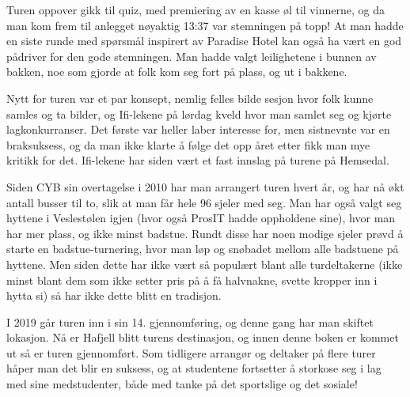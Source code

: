 Turen oppover gikk til quiz, med premiering av en kasse øl til vinnerne, og da man kom frem til anlegget nøyaktig 13:37 var stemningen på topp! At man hadde en siste runde med spørsmål inspirert av Paradise Hotel kan også ha vært en god pådriver for den gode stemningen. Man hadde valgt leilighetene i bunnen av bakken, noe som gjorde at folk kom seg fort på plass, og ut i bakkene.

Nytt for turen var et par konsept, nemlig felles bilde sesjon hvor folk kunne samles og ta bilder, og Ifi-lekene på lørdag kveld hvor man samlet seg og kjørte lagkonkurranser. Det første var heller laber interesse for, men sistnevnte var en braksuksess, og da man ikke klarte å følge det opp året etter fikk man mye kritikk for det. Ifi-lekene har siden vært et fast innslag på turene på Hemsedal.

Siden CYB sin overtagelse i 2010 har man arrangert turen hvert år, og har nå økt antall busser til to, slik at man får hele 96 sjeler med seg. Man har også valgt seg hyttene i Veslestølen igjen (hvor også ProsIT hadde oppholdene sine), hvor man har mer plass, og ikke minst badstue. Rundt disse har noen modige sjeler prøvd å starte en badstue-turnering, hvor man løp og snøbadet mellom alle badstuene på hyttene. Men siden dette har ikke vært så populært blant alle turdeltakerne (ikke minst blant dem som ikke setter pris på å få halvnakne, svette kropper inn i hytta si) så har ikke dette blitt en tradisjon.

I 2019 går turen inn i sin 14. gjennomføring, og denne gang har man skiftet lokasjon. Nå er Hafjell blitt turens destinasjon, og innen denne boken er kommet ut så er turen gjennomført. Som tidligere arrangør og deltaker på flere turer håper man det blir en suksess, og at studentene fortsetter å storkose seg i lag med sine medstudenter, både med tanke på det sportslige og det sosiale!
